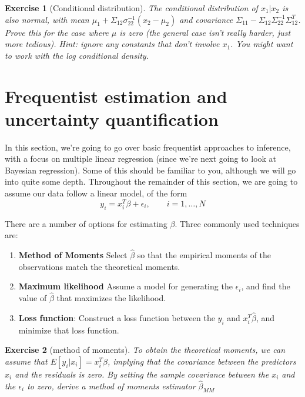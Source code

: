 \documentclass[twoside]{article}
\newcounter{lecnum}
\newtheorem{exercise}{Exercise}[lecnum]
\begin{document}
\begin{exercise}[Conditional distribution]
  The conditional distribution of $x_1|x_2$ is also normal, with mean $\mu_1+\Sigma_{12}\sigma_{22}^{-1}(x_2-\mu_2)$ and covariance $\Sigma_{11} - \Sigma_{12}\Sigma_{22}^{-1}\Sigma_{12}^T$. Prove this for the case where $\mu$ is zero (the general case isn't really harder, just more tedious). \textit{Hint: ignore any constants that don't involve $x_1$. You might want to work with the log conditional density.}
\end{exercise}
  

\section{Frequentist estimation and uncertainty quantification}

In this section, we're going to go over basic frequentist approaches to inference, with a focus on multiple linear regression (since we're next going to look at Bayesian regression). Some of this should be familiar to you, although we will go into quite some depth. Throughout the remainder of this section, we are going to assume our data follow a linear model, of the form
$$y_i = x_i^T\beta + \epsilon_i,\qquad i=1,\dots,N$$

There are a number of options for estimating $\beta$. Three commonly used techniques are:
\begin{enumerate}
\item \textbf{Method of Moments} Select $\hat{\beta}$ so that the empirical moments of the observations match the theoretical moments.
\item \textbf{Maximum likelihood} Assume a model for generating the $\epsilon_i$, and find the value of $\hat{\beta}$ that maximizes the likelihood.
\item \textbf{Loss function}: Construct a loss function between the $y_i$ and $x_i^T\hat{\beta}$, and minimize that loss function.
\end{enumerate}

\begin{exercise}[method of moments]
  To obtain the theoretical moments, we can assume that $E[y_i|x_i] = x_i^T\beta$, implying that the covariance between the predictors $x_i$ and the residuals is zero. By setting the sample covariance between the $x_i$ and the $\epsilon_i$ to zero, derive a method of moments estimator $\hat{\beta}_{MM}$
\end{exercise}
\end{document}
